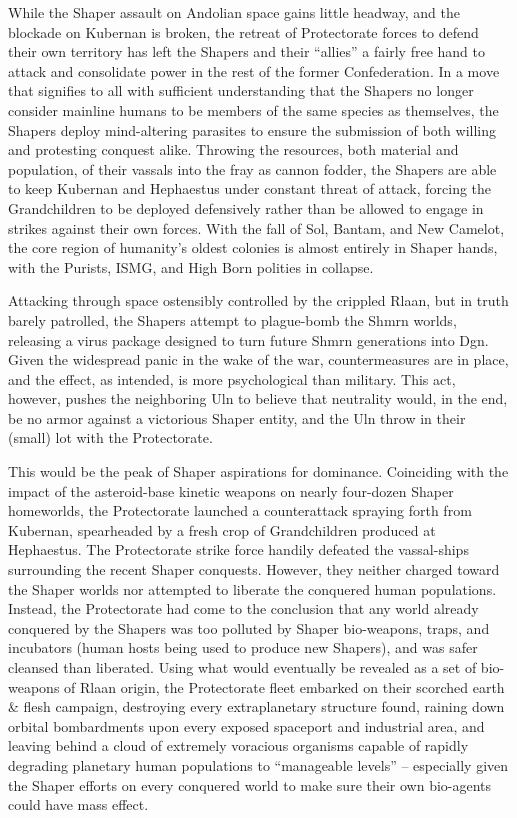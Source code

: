 While the Shaper assault on Andolian space gains little headway, and the blockade on Kubernan is broken, the retreat of Protectorate forces to defend their own territory has left the Shapers and their “allies” a fairly free hand to attack and consolidate power in the rest of the former Confederation. In a move that signifies to all with sufficient understanding that the Shapers no longer consider mainline humans to be members of the same species as themselves, the Shapers deploy mind-altering parasites to ensure the submission of both willing and protesting conquest alike. Throwing the resources, both  material and population, of their vassals into the fray as cannon fodder, the Shapers are able to keep Kubernan and Hephaestus under constant threat of attack, forcing the Grandchildren to be deployed defensively rather than be allowed to engage in strikes against their own forces. With the fall of Sol, Bantam, and New Camelot, the core region of humanity’s oldest colonies is almost entirely in Shaper hands, with the Purists, ISMG, and High Born polities in collapse.

Attacking through space ostensibly controlled by the crippled Rlaan, but in truth barely patrolled, the Shapers attempt to plague-bomb the Shmrn worlds, releasing a virus package designed to turn future Shmrn generations into Dgn. Given the widespread panic in the wake of the war, countermeasures are in place, and the effect, as intended, is more psychological than military. This act, however, pushes the neighboring Uln to believe that neutrality would, in the end, be no armor against a victorious Shaper entity, and the Uln throw in their (small) lot with the Protectorate.

This would be the peak of Shaper aspirations for dominance. Coinciding with the impact of the asteroid-base kinetic weapons on nearly four-dozen Shaper homeworlds, the Protectorate launched a counterattack spraying forth from Kubernan, spearheaded by a fresh crop of Grandchildren produced at Hephaestus. The Protectorate strike force handily defeated the vassal-ships surrounding the recent Shaper conquests. However, they neither charged toward the Shaper worlds nor attempted to liberate the conquered human populations. Instead, the Protectorate had come to the conclusion that any world already conquered by the Shapers was too polluted by Shaper bio-weapons, traps, and incubators (human hosts being used to produce new Shapers), and was safer cleansed than liberated. Using what would eventually be revealed as a set of bio-weapons of Rlaan origin, the Protectorate fleet embarked on their scorched earth \& flesh campaign, destroying every extraplanetary structure found, raining down orbital bombardments upon every exposed spaceport and industrial area, and leaving behind a cloud of extremely voracious organisms capable of rapidly degrading planetary human populations to “manageable levels” – especially given the Shaper efforts on every conquered world to make sure their own bio-agents could have mass effect.

